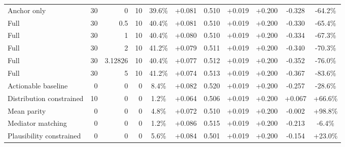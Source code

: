 \begin{table}[htbp]
\begin{tabular}{lrrrccccccc}
Anchor only & 30 & 0 & 10 & 39.6\% & +0.081 & 0.510 & +0.019 & +0.200 & -0.328 & -64.2\% \\
Full & 30 & 0.5 & 10 & 40.4\% & +0.081 & 0.510 & +0.019 & +0.200 & -0.330 & -65.4\% \\
Full & 30 & 1 & 10 & 40.4\% & +0.080 & 0.510 & +0.019 & +0.200 & -0.334 & -67.3\% \\
Full & 30 & 2 & 10 & 41.2\% & +0.079 & 0.511 & +0.019 & +0.200 & -0.340 & -70.3\% \\
Full & 30 & 3.12826 & 10 & 40.4\% & +0.077 & 0.512 & +0.019 & +0.200 & -0.352 & -76.0\% \\
Full & 30 & 5 & 10 & 41.2\% & +0.074 & 0.513 & +0.019 & +0.200 & -0.367 & -83.6\% \\
Actionable baseline & 0 & 0 & 0 & 8.4\% & +0.082 & 0.520 & +0.019 & +0.200 & -0.257 & -28.6\% \\
Distribution constrained & 10 & 0 & 0 & 1.2\% & +0.064 & 0.506 & +0.019 & +0.200 & +0.067 & +66.6\% \\
Mean parity & 0 & 0 & 0 & 4.8\% & +0.072 & 0.510 & +0.019 & +0.200 & -0.002 & +98.8\% \\
Mediator matching & 0 & 0 & 0 & 1.2\% & +0.086 & 0.515 & +0.019 & +0.200 & -0.213 & -6.4\% \\
Plausibility constrained & 0 & 0 & 0 & 5.6\% & +0.084 & 0.501 & +0.019 & +0.200 & -0.154 & +23.0\% \\
\bottomrule
\end{tabular}
\end{table}